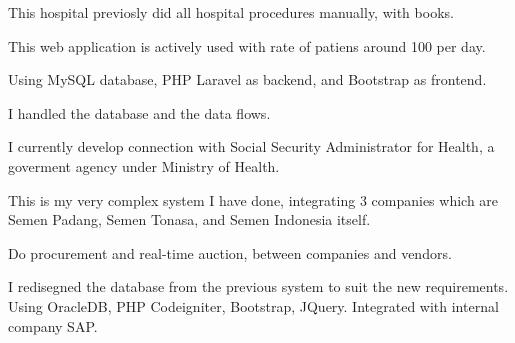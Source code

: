 \documentclass[letterpaper]{deedy-resume} %
\begin{document}
\begin{minipage}[t]{0.66\textwidth}
\begin{tightitemize}
\item This hospital previosly did all hospital procedures manually, with books.
\item This web application is actively used with rate of patiens around 100 per day.
\item Using MySQL database, PHP Laravel as backend, and Bootstrap as frontend.
\item I handled the database and the data flows.
\item I currently develop connection with Social Security Administrator for Health, a goverment agency under Ministry of Health.
\end{tightitemize}
\sectionspace

\begin{tightitemize}
\item This is my very complex system I have done, integrating 3 companies which are Semen Padang, Semen Tonasa, and Semen Indonesia itself.
\item Do procurement and real-time auction, between companies and vendors.
\item I redisegned the database from the previous system to suit the new requirements. Using OracleDB, PHP Codeigniter, Bootstrap, JQuery. Integrated with internal company SAP.
\end{tightitemize}
\sectionspace




\end{minipage}
\end{document}
